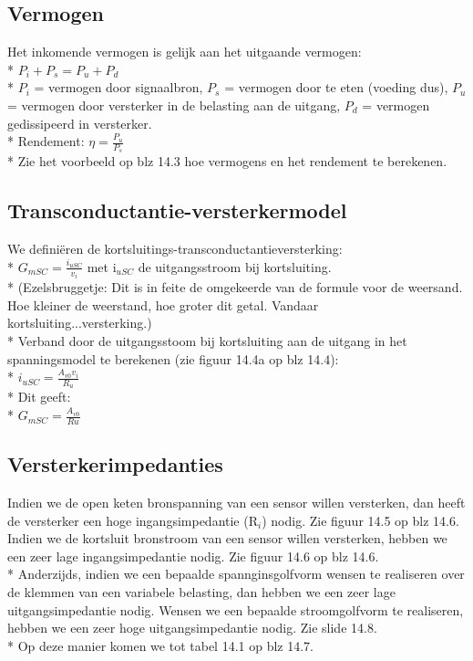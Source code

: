 \documentclass[10pt]{article}
\begin{document}
\subsection{Vermogen}
Het inkomende vermogen is gelijk aan het uitgaande vermogen:\\*
$P_i + P_s = P_u + P_d$\\*
$P_i$ = vermogen door signaalbron, $P_s$ = vermogen door te eten (voeding dus), $P_u$ = vermogen door versterker in de belasting aan de uitgang, $P_d$ = vermogen gedissipeerd in versterker.\\*
Rendement: $\eta = \frac{P_u}{P_s}$\\*
Zie het voorbeeld op blz 14.3 hoe vermogens en het rendement te berekenen.
\subsection{Transconductantie-versterkermodel}
We defini\"eren de kortsluitings-transconductantieversterking:\\*
$G_{mSC} = \frac{i_{uSC}}{v_i}$ met i$_{uSC}$ de uitgangsstroom bij kortsluiting.\\*
{\scriptsize (Ezelsbruggetje: Dit is in feite de omgekeerde van de formule voor de weersand. Hoe kleiner de weerstand, hoe groter dit getal. Vandaar kortsluiting...versterking.)}\\*
Verband door de uitgangsstoom bij kortsluiting aan de uitgang in het spanningsmodel te berekenen (zie figuur 14.4a op blz 14.4):\\*
$i_{uSC} = \frac{A_{v0}v_i}{R_u}$\\*
Dit geeft:\\*
$G_{mSC} = \frac{A_{v0}}{Ru}$
\subsection{Versterkerimpedanties}
Indien we de open keten bronspanning van een sensor willen versterken, dan heeft de versterker een hoge ingangsimpedantie (R$_i$) nodig. Zie figuur 14.5 op blz 14.6. Indien we de kortsluit bronstroom van een sensor willen versterken, hebben we een zeer lage ingangsimpedantie nodig. Zie figuur 14.6 op blz 14.6.\\*
Anderzijds, indien we een bepaalde spannginsgolfvorm wensen te realiseren over de klemmen van een variabele belasting, dan hebben we een zeer lage uitgangsimpedantie nodig. Wensen we een bepaalde stroomgolfvorm te realiseren, hebben we een zeer hoge uitgangsimpedantie nodig. Zie slide 14.8.\\*
Op deze manier komen we tot tabel 14.1 op blz 14.7.
\end{document}
